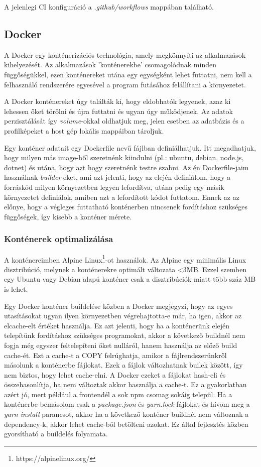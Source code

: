 A jelenlegi CI konfiguráció a \textit{.github/workflows} mappában található.

\subsection{Docker}
A Docker egy konténerizációs technológia, amely megkönnyíti az alkalmazások kihelyezését. Az alkalmazások 'konténerekbe' csomagolódnak minden függőségükkel, ezen konténereket utána egy egységként lehet futtatni, nem kell a felhasználó rendszerére egyesével a program futásához felállítani a környezetet.

A Docker konténereket úgy találták ki, hogy eldobhatók legyenek, azaz ki lehessen őket törölni és újra futtatni és ugyan úgy működjenek. Az adatok perzisztálását így \textit{volume}-okkal oldhatjuk meg, jelen esetben az adatbázis és a profilképeket a host gép lokális mappáiban tároljuk.

Egy konténer adatait egy Dockerfile nevű fájlban definiálhatjuk. Itt megadhatjuk, hogy milyen más image-ből szeretnénk kiindulni (pl.: ubuntu, debian, node.js, dotnet) és utána, hogy azt hogy szeretnénk testre szabni. Az én Dockerfile-jaim használnak \textit{builder}-eket, ami azt jelenti, hogy az elején definiálom, hogy a forráskód milyen környezetben legyen lefordítva, utána pedig egy másik környezetet definiálok, amiben azt a lefordított kódot futtatom. Ennek az az előnye, hogy a végleges futtatható konténerben nincsenek fordításhoz szükséges függőségek, így kisebb a konténer mérete.

\subsubsection{Konténerek optimalizálása}

A konténereimben Alpine Linux\footnote{https://alpinelinux.org/}-ot használok. Az Alpine egy minimális Linux disztribúció, melynek a konténerekre optimált változata <3MB. Ezzel szemben egy Ubuntu vagy Debian alapú konténer csak a disztribúciók miatt több száz MB is lehet.

Egy Docker konténer buildelése közben a Docker megjegyzi, hogy az egyes utasításokat ugyan ilyen környezetben végrehajtotta-e már, ha igen, akkor az elcache-elt értéket használja. Ez azt jelenti, hogy ha a konténerünk elején telepítünk fordításhoz szükséges programokat, akkor a következő buildnél nem fogja még egyszer feltelepíteni őket nulláról, hanem használja az előző build cache-ét. Ezt a cache-t a COPY felrúghatja, amikor a fájlrendszerünkről másolunk a konténerbe fájlokat. Ezek a fájlok változhatnak builek között, így nem biztos, hogy lehet cache-elni. A Docker ezeket a fájlokat hash-eli és összehasonlítja, ha nem változtak akkor használja a cache-t. Ez a gyakorlatban azért jó, mert például a frontendél a sok npm csomag sokáig települ. Ha a konténerbe bemásolom csak a \textit{package.json} és \textit{yarn.lock} fájlokat és hívom meg a \textit{yarn install} parancsot, akkor ha a következő konténer buildnél nem változnak a dependency-k, akkor lehet cache-ből betölteni azokat. Ez által fejlesztés közben gyorsítható a buildelés folyamata.

